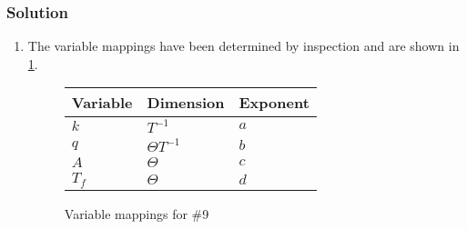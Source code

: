 \documentclass[12pt]{article}
\begin{document}
\subsubsection*{Solution}
\begin{enumerate}
\item The variable mappings have been determined by inspection and are shown in
  \cref{fig:9-var-mappings}.

  \begin{figure}
    \centering
    \begin{tabularx}{0.5\textwidth}{XXX}
      Variable & Dimension & Exponent \\ \hline
      $k$ & $T^{-1}$ & $a$ \\
      $q$ & $\Theta T^{-1}$ & $b$ \\
      $A$ & $\Theta$ & $c$ \\
      $T_f$ & $\Theta$ & $d$ \\
    \end{tabularx}
    \caption{Variable mappings for \#9}
    \label{fig:9-var-mappings}
  \end{figure}


\end{enumerate}
\end{document}
